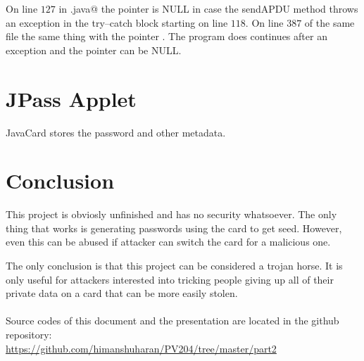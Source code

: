\documentclass[paper=a4, fontsize=12pt]{scrartcl}
\begin{document}
On line $127$ in \verb@CardInterface.java@ the pointer \verb@response@ is NULL in case the sendAPDU method throws an exception in the try--catch block starting on line $118$.
On line $387$ of the same file the same thing with the pointer \verb@encrypted@. The program does continues after an exception and the pointer can be NULL.

\section{JPass Applet}
JavaCard stores the password and other metadata.%

\section{Conclusion}
This project is obviosly unfinished and has no security whatsoever.
The only thing that works is generating passwords using the card to get seed.
However, even this can be abused if attacker can switch the card for a malicious one.

The only conclusion is that this project can be considered a trojan horse.
It is only useful for attackers interested into tricking people giving up all of their private data on a card that can be more easily stolen.
\\
\\
Source codes of this document and the presentation are located in the github repository:
\\ \url{https://github.com/himanshuharan/PV204/tree/master/part2}
\end{document}
